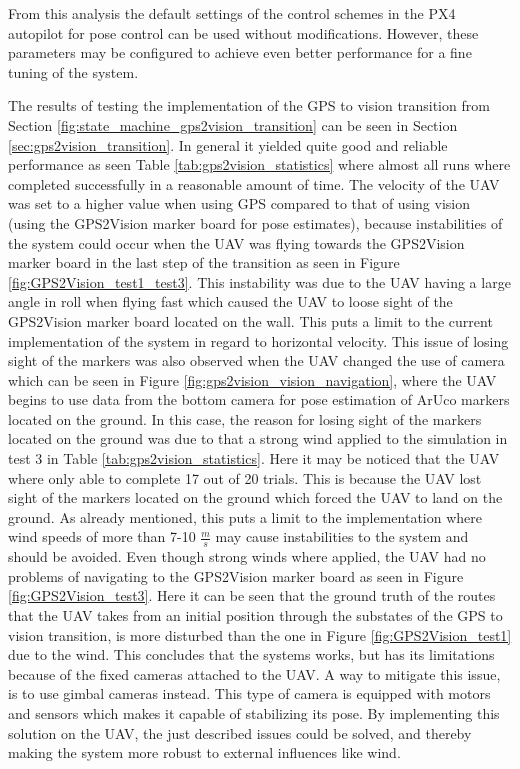 \documentclass[../Head/report.tex]{subfiles}
\begin{document}
From this analysis the default settings of the control schemes in the PX4 autopilot for pose control can be used without modifications. However, these parameters may be configured to achieve even better performance for a fine tuning of the system.

The results of testing the implementation of the GPS to vision transition from Section \ref{fig:state_machine_gps2vision_transition} can be seen in Section \ref{sec:gps2vision_transition}. In general it yielded quite good and reliable performance as seen Table \ref{tab:gps2vision_statistics} where almost all runs where completed successfully in a reasonable amount of time. The velocity of the UAV was set to a higher value when using GPS compared to that of using vision (using the GPS2Vision marker board for pose estimates), because instabilities of the system could occur when the UAV was flying towards the GPS2Vision marker board in the last step of the transition as seen in Figure \ref{fig:GPS2Vision_test1_test3}. This instability was due to the UAV having a large angle in roll when flying fast which caused the UAV to loose sight of the GPS2Vision marker board located on the wall. This puts a limit to the current implementation of the system in regard to horizontal velocity. This issue of losing sight of the markers was also observed when the UAV changed the use of camera which can be seen in Figure \ref{fig:gps2vision_vision_navigation}, where the UAV begins to use data from the bottom camera for pose estimation of ArUco markers located on the ground. In this case, the reason for losing sight of the markers located on the ground was due to that a strong wind applied to the simulation in test 3 in Table \ref{tab:gps2vision_statistics}. Here it may be noticed that the UAV where only able to complete 17 out of 20 trials. This is because the UAV lost sight of the markers located on the ground which forced the UAV to land on the ground. As already mentioned, this puts a limit to the implementation where wind speeds of more than 7-10 $\frac{m}{s}$ may cause instabilities to the system and should be avoided. Even though strong winds where applied, the UAV had no problems of navigating to the GPS2Vision marker board as seen in Figure \ref{fig:GPS2Vision_test3}. Here it can be seen that the ground truth of the routes that the UAV takes from an initial position through the substates of the GPS to vision transition, is more disturbed than the one in Figure \ref{fig:GPS2Vision_test1} due to the wind. This concludes that the systems works, but has its limitations because of the fixed cameras attached to the UAV. A way to mitigate this issue, is to use gimbal cameras instead. This type of camera is equipped with motors and sensors which makes it capable of stabilizing its pose. By implementing this solution on the UAV, the just described issues could be solved, and thereby making the system more robust to external influences like wind.     
\end{document}
